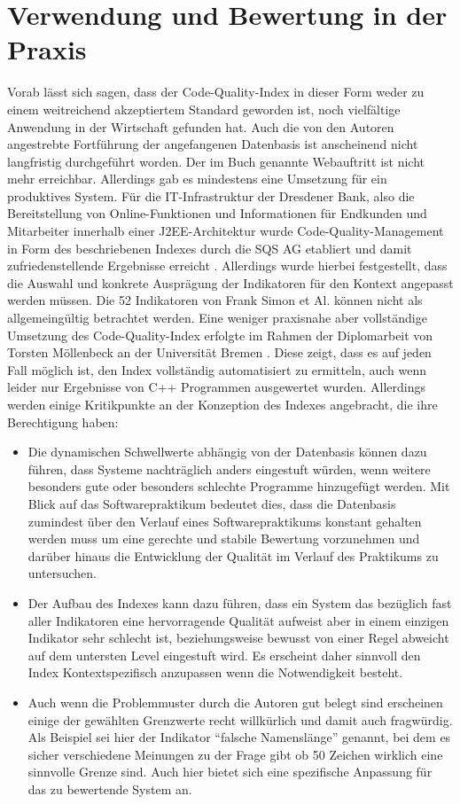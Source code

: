 \documentclass[da,ngerman]{stthesis}
\begin{document}
		\section{Verwendung und Bewertung in der Praxis}
			Vorab lässt sich sagen, dass der Code-Quality-Index in dieser Form weder zu einem weitreichend akzeptiertem Standard geworden ist, noch vielfältige Anwendung in der Wirtschaft gefunden hat. Auch die von den Autoren angestrebte Fortführung der angefangenen Datenbasis ist anscheinend nicht langfristig durchgeführt worden. Der im Buch genannte Webauftritt ist nicht mehr erreichbar. \newline
			Allerdings gab es mindestens eine Umsetzung für ein produktives System. Für die IT-Infrastruktur der Dresdener Bank, also die Bereitstellung von Online-Funktionen und Informationen für Endkunden und Mitarbeiter innerhalb einer J2EE-Architektur wurde Code-Quality-Management in Form des beschriebenen Indexes durch die SQS AG etabliert und damit zufriedenstellende Ergebnisse erreicht \cite{DresdnerBank}. Allerdings wurde hierbei festgestellt, dass die Auswahl und konkrete Ausprägung der Indikatoren für den Kontext angepasst werden müssen. Die 52 Indikatoren von Frank Simon et Al. können nicht als allgemeingültig betrachtet werden. \newline
			Eine weniger praxisnahe aber vollständige Umsetzung des Code-Quality-Index erfolgte im Rahmen der Diplomarbeit von Torsten Möllenbeck an der Universität Bremen \cite{DAIndexUmsetzung}. Diese zeigt, dass es auf jeden Fall möglich ist, den Index vollständig automatisiert zu ermitteln, auch wenn leider nur Ergebnisse von C++ Programmen ausgewertet wurden. Allerdings werden einige Kritikpunkte an der Konzeption des Indexes angebracht, die ihre Berechtigung haben:
			\begin{itemize}
				\item Die dynamischen Schwellwerte abhängig von der Datenbasis können dazu führen, dass Systeme nachträglich anders eingestuft würden, wenn weitere besonders gute oder besonders schlechte Programme hinzugefügt werden. Mit Blick auf das Softwarepraktikum bedeutet dies, dass die Datenbasis zumindest über den Verlauf eines Softwarepraktikums konstant gehalten werden muss um eine gerechte und stabile Bewertung vorzunehmen und darüber hinaus die Entwicklung der Qualität im Verlauf des Praktikums zu untersuchen.
				\item Der Aufbau des Indexes kann dazu führen, dass ein System das bezüglich fast aller Indikatoren eine hervorragende Qualität aufweist aber in einem einzigen Indikator sehr schlecht ist, beziehungsweise bewusst von einer Regel abweicht auf dem untersten Level eingestuft wird. Es erscheint daher sinnvoll den Index Kontextspezifisch anzupassen wenn die Notwendigkeit besteht.
				\item Auch wenn die Problemmuster durch die Autoren gut belegt sind erscheinen einige der gewählten Grenzwerte recht willkürlich und damit auch fragwürdig. Als Beispiel sei hier der Indikator "`falsche Namenslänge"' genannt, bei dem es sicher verschiedene Meinungen zu der Frage gibt ob 50 Zeichen wirklich eine sinnvolle Grenze sind. Auch hier bietet sich eine spezifische Anpassung für das zu bewertende System an.
			\end{itemize}
\end{document}
